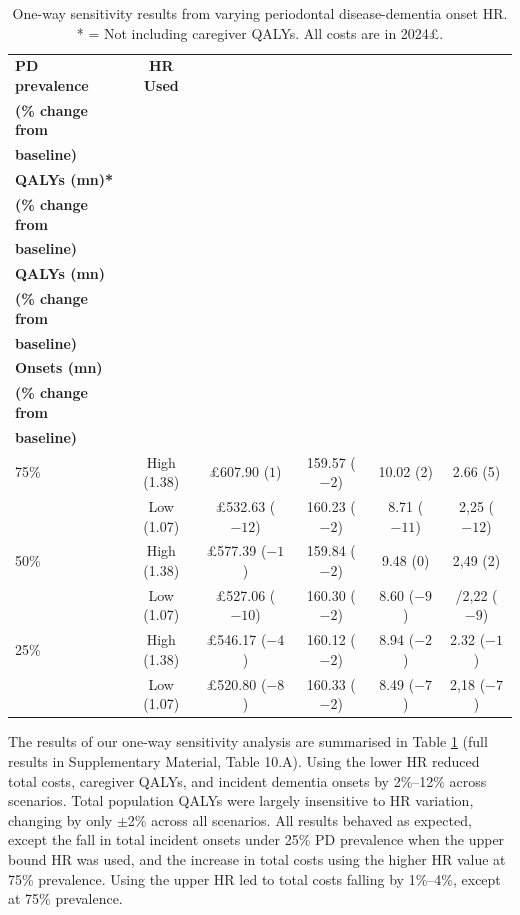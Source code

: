 \documentclass[11pt,a4paper]{article}
\begin{document}
\begin{table}[htbp]
\centering
\caption{One-way sensitivity results from varying periodontal disease-dementia onset HR. * = Not including caregiver QALYs. All costs are in 2024\pounds.}
\label{tab:oneway}
\footnotesize
\begin{tabular}{lccccc}
\toprule
\textbf{PD prevalence} & \textbf{HR Used} & \makecell{\textbf{Total Costs (£bn)} \\ \textbf{(\% change from} \\ \textbf{baseline)}} & \makecell{\textbf{Total population} \\ \textbf{QALYs (mn)*} \\ \textbf{(\% change from} \\ \textbf{baseline)}} & \makecell{\textbf{Total caregiver} \\ \textbf{QALYs (mn)} \\ \textbf{(\% change from} \\ \textbf{baseline)}} & \makecell{\textbf{Total Incident} \\ \textbf{Onsets (mn)} \\ \textbf{(\% change from} \\ \textbf{baseline)}} \\
\midrule
75\% & High (1.38) & \pounds607.90 ($1$) & 159.57 ($-2$) & 10.02 (2) & 2.66 (5) \\
 & Low (1.07) & \pounds532.63 ($-12$) & 160.23 ($-2$) & 8.71 ($-11$) & 2,25 ($-12$) \\
50\% & High (1.38) & \pounds577.39 ($-1$) & 159.84 ($-2$) & 9.48 ($0$) & 2,49 (2) \\
 & Low (1.07) & \pounds527.06 ($-10$) & 160.30 ($-2$) & 8.60 ($-9$) & /2,22 ($-9$) \\
25\% & High (1.38) & \pounds546.17 ($-4$) & 160.12 ($-2$) & 8.94 ($-2$) & 2.32 ($-1$) \\
 & Low (1.07) & \pounds520.80 ($-8$) & 160.33 ($-2$) & 8.49 ($-7$) & 2,18 ($-7$) \\
\bottomrule
\end{tabular}
\end{table}

The results of our one-way sensitivity analysis are summarised in Table \ref{tab:oneway} (full results in Supplementary Material, Table 10.A). Using the lower HR reduced total costs, caregiver QALYs, and incident dementia onsets by 2\%--12\% across scenarios. Total population QALYs were largely insensitive to HR variation, changing by only $\pm$2\% across all scenarios. All results behaved as expected, except the fall in total incident onsets under 25\% PD prevalence when the upper bound HR was used, and the increase in total costs using the higher HR value at 75\% prevalence. Using the upper HR led to total costs falling by 1\%--4\%, except at 75\% prevalence.
\end{document}
